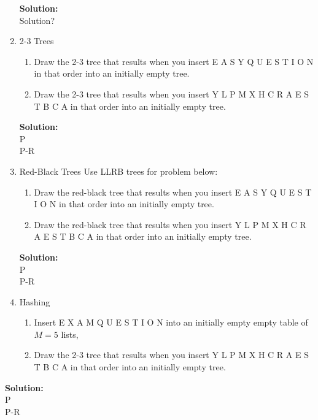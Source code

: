 \documentclass{article}\usepackage{amsmath,amssymb,amsthm,tikz,tkz-graph,color,chngpage,soul,hyperref,csquotes,graphicx,floatrow}\newcommand*{\QEDB}{\hfill\ensuremath{\square}}\newtheorem*{prop}{Proposition}\renewcommand{\theenumi}{\alph{enumi}}\usepackage[shortlabels]{enumitem}\usepackage[nobreak=true]{mdframed}\usetikzlibrary{matrix,calc}\MakeOuterQuote{"}\usepackage[margin=0.75in]{geometry} \newtheorem{theorem}{Theorem}
\begin{document}
\begin{enumerate}[1.]
\begin{enumerate}[a)]
\end{enumerate}

\begin{mdframed}
\textbf{Solution:} \\
Solution?
\end{mdframed}



\item 2-3 Trees
\begin{enumerate}[1)]
\item Draw the 2-3 tree that results when you insert E A S Y Q U E S T I O N in that order into an initially empty tree.
\item Draw the 2-3 tree that results when you insert Y L P M X H C R A E S T B C A in that order into an initially empty tree.
\end{enumerate}



\begin{mdframed}
\textbf{Solution:} \\
P \\
P-R\\

\end{mdframed}



\item Red-Black Trees
Use LLRB trees for problem below:
\begin{enumerate}[1)]
\item Draw the red-black tree that results when you insert E A S Y Q U E S T I O N in that order into an initially empty tree.
\item Draw the red-black tree that results when you insert Y L P M X H C R A E S T B C A in that order into an initially empty tree.
\end{enumerate}



\begin{mdframed}
\textbf{Solution:} \\
P \\
P-R\\

\end{mdframed}


\item Hashing
\begin{enumerate}[1)]
\item Insert E X A M Q U E S T I O N into an initially empty empty table of $M=5$ lists,
\item Draw the 2-3 tree that results when you insert Y L P M X H C R A E S T B C A in that order into an initially empty tree.
\end{enumerate}

\end{enumerate}

\begin{mdframed}
\textbf{Solution:} \\
P \\
P-R\\

\end{mdframed}
\end{document}
